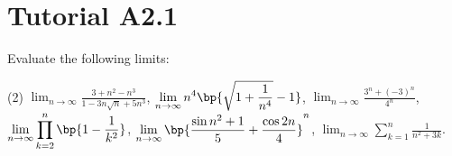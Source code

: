 \section{Tutorial A2.1}

\begin{problem}
    Evaluate the following limits:

    \begin{tasks}(2)
        \task $\displaystyle \lim_{n \to \infty} \frac{3 + n^2 - n^3}{1 - 3n\sqrt{n} + 5n^3}$,
        \task $\displaystyle \lim_{n \to \infty} n^4 \bp{\sqrt{1 + \frac1{n^4}} - 1}$,
        \task $\displaystyle \lim_{n \to \infty} \frac{3^n + (-3)^n}{4^n}$,
        \task $\displaystyle \lim_{n \to \infty} \prod_{k = 2}^n \bp{1 - \frac1{k^2}}$,
        \task $\displaystyle \lim_{n \to \infty} \bp{\frac{\sin{n^2 +1}}{5} + \frac{\cos{2n}}{4}}^n$,
        \task $\displaystyle \lim_{n \to \infty} \sum_{k = 1}^n \frac1{n^2 + 3k}$.
    \end{tasks}
\end{problem}

